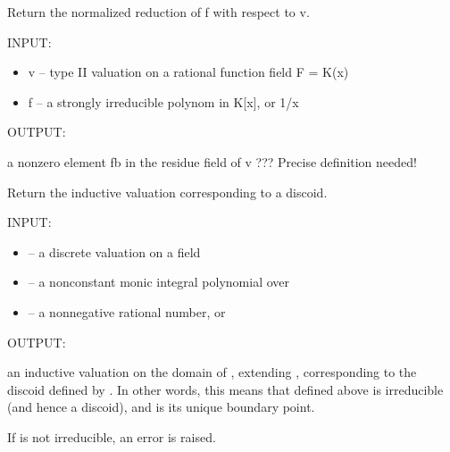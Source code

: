 \documentclass[letterpaper,10pt,english]{sphinxmanual}
\begin{document}
\begin{fulllineitems}
\label{berkovich_line:mclf.berkovich.berkovich_line.normalized_reduction}
Return the normalized reduction of f with respect to v.

INPUT:
\begin{itemize}
\item {} 
v -- type II valuation on a rational function field F = K(x)

\item {} 
f -- a strongly irreducible polynom in K{[}x{]}, or 1/x

\end{itemize}

OUTPUT:

a nonzero element fb in the residue field of v ???
Precise definition needed!

\end{fulllineitems}


\begin{fulllineitems}
\label{berkovich_line:mclf.berkovich.berkovich_line.valuation_from_discoid}
Return the inductive valuation corresponding to a discoid.

INPUT:
\begin{itemize}
\item {} 
 -- a discrete valuation on a field 

\item {} 
 -- a nonconstant monic integral polynomial over 

\item {} 
 -- a nonnegative rational number, or 

\end{itemize}

OUTPUT:

an inductive valuation  on the domain of , extending ,
corresponding to the discoid  defined by . In other words,
this means that  defined above is irreducible (and hence a discoid),
and  is its unique boundary point.

If  is not irreducible, an error is raised.

\end{fulllineitems}
\end{document}
